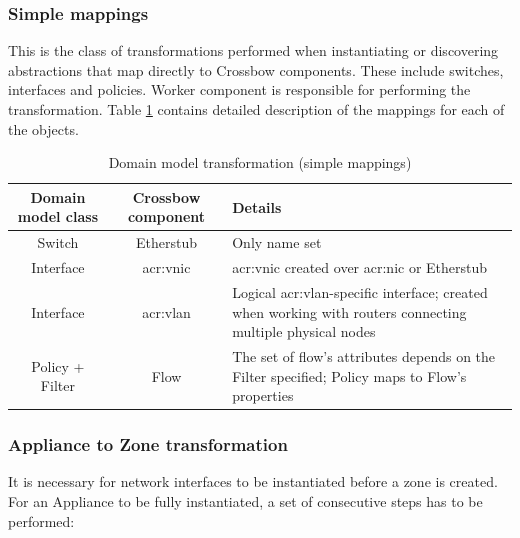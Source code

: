 \documentclass[11pt]{book}
\begin{document}
        \subsubsection{Simple mappings}

          This is the class of transformations performed when instantiating or discovering abstractions that map
          directly to Crossbow components. These include switches, interfaces and policies. Worker component is
          responsible for performing the transformation. Table \ref{tab:impl:simple-mapping} contains detailed
          description of the mappings for each of the objects.

          \begin{table}[H]

            \centering

            \begin{tabularx}{\textwidth}{|c|c|X|}
              \hline
              Domain model class & Crossbow component & \centering Details \tabularnewline
              \hline \hline
              Switch             & Etherstub          & Only name set \\
              \hline
              Interface          & \gls{acr:vnic}     & \gls{acr:vnic} created over \gls{acr:nic} or Etherstub \\
              \hline
              Interface          & \gls{acr:vlan}     & Logical \gls{acr:vlan}-specific interface; created when working
                                                        with routers connecting multiple physical nodes \\
              \hline
              Policy + Filter    & Flow               & The set of flow's attributes depends on the Filter specified;
                                                        Policy maps to Flow's properties \\
              \hline
            \end{tabularx}

            \caption{Domain model transformation (simple mappings)}
            \label{tab:impl:simple-mapping}

          \end{table}


        \subsubsection{Appliance to Zone transformation}

          It is necessary for network interfaces to be instantiated before a zone is created. For an Appliance to be
          fully instantiated, a set of consecutive steps has to be performed:
\end{document}
